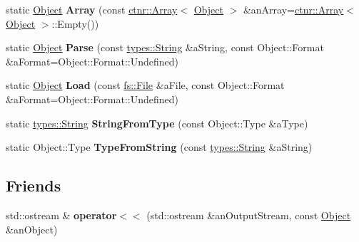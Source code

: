 \begin{DoxyCompactItemize}
\item 
\mbox{\label{classlibrary_1_1core_1_1ctnr_1_1_object_a50bd77bd1a9d978f3459ef69ab58f465}} 
static \hyperlink{classlibrary_1_1core_1_1ctnr_1_1_object}{Object} {\bfseries Array} (const \hyperlink{classlibrary_1_1core_1_1ctnr_1_1_array}{ctnr\+::\+Array}$<$ \hyperlink{classlibrary_1_1core_1_1ctnr_1_1_object}{Object} $>$ \&an\+Array=\hyperlink{classlibrary_1_1core_1_1ctnr_1_1_array}{ctnr\+::\+Array}$<$ \hyperlink{classlibrary_1_1core_1_1ctnr_1_1_object}{Object} $>$\+::Empty())
\item 
\mbox{\label{classlibrary_1_1core_1_1ctnr_1_1_object_a31cb8fb2efb90be411044247b64fe854}} 
static \hyperlink{classlibrary_1_1core_1_1ctnr_1_1_object}{Object} {\bfseries Parse} (const \hyperlink{classlibrary_1_1core_1_1types_1_1_string}{types\+::\+String} \&a\+String, const Object\+::\+Format \&a\+Format=Object\+::\+Format\+::\+Undefined)
\item 
\mbox{\label{classlibrary_1_1core_1_1ctnr_1_1_object_a508e658f6525f7607a7fa869c3ac4df5}} 
static \hyperlink{classlibrary_1_1core_1_1ctnr_1_1_object}{Object} {\bfseries Load} (const \hyperlink{classlibrary_1_1core_1_1fs_1_1_file}{fs\+::\+File} \&a\+File, const Object\+::\+Format \&a\+Format=Object\+::\+Format\+::\+Undefined)
\item 
\mbox{\label{classlibrary_1_1core_1_1ctnr_1_1_object_ae5d344e0d745883958536ce6595ed641}} 
static \hyperlink{classlibrary_1_1core_1_1types_1_1_string}{types\+::\+String} {\bfseries String\+From\+Type} (const Object\+::\+Type \&a\+Type)
\item 
\mbox{\label{classlibrary_1_1core_1_1ctnr_1_1_object_ac9ea909125427ebfe1b719596117cf5b}} 
static Object\+::\+Type {\bfseries Type\+From\+String} (const \hyperlink{classlibrary_1_1core_1_1types_1_1_string}{types\+::\+String} \&a\+String)
\end{DoxyCompactItemize}
\subsection*{Friends}
\begin{DoxyCompactItemize}
\item 
\mbox{\label{classlibrary_1_1core_1_1ctnr_1_1_object_a418df9bf4a73078f3d494edef1743f8d}} 
std\+::ostream \& {\bfseries operator$<$$<$} (std\+::ostream \&an\+Output\+Stream, const \hyperlink{classlibrary_1_1core_1_1ctnr_1_1_object}{Object} \&an\+Object)
\end{DoxyCompactItemize}


